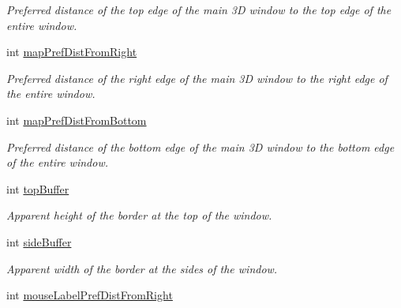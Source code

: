 \begin{DoxyCompactItemize}
\begin{DoxyCompactList}\small\item\em Preferred distance of the top edge of the main 3D window to the top edge of the entire window. \end{DoxyCompactList}\item 
\hypertarget{class_three_d_viewer_aa0bb32786f3a608cca7b11e56c18df91}{
int \hyperlink{class_three_d_viewer_aa0bb32786f3a608cca7b11e56c18df91}{mapPrefDistFromRight}}
\label{class_three_d_viewer_aa0bb32786f3a608cca7b11e56c18df91}

\begin{DoxyCompactList}\small\item\em Preferred distance of the right edge of the main 3D window to the right edge of the entire window. \end{DoxyCompactList}\item 
\hypertarget{class_three_d_viewer_a47fd9ef4a19bc68502192b2423449684}{
int \hyperlink{class_three_d_viewer_a47fd9ef4a19bc68502192b2423449684}{mapPrefDistFromBottom}}
\label{class_three_d_viewer_a47fd9ef4a19bc68502192b2423449684}

\begin{DoxyCompactList}\small\item\em Preferred distance of the bottom edge of the main 3D window to the bottom edge of the entire window. \end{DoxyCompactList}\item 
\hypertarget{class_three_d_viewer_a718c6698151357508ca72bc9a432a3a0}{
int \hyperlink{class_three_d_viewer_a718c6698151357508ca72bc9a432a3a0}{topBuffer}}
\label{class_three_d_viewer_a718c6698151357508ca72bc9a432a3a0}

\begin{DoxyCompactList}\small\item\em Apparent height of the border at the top of the window. \end{DoxyCompactList}\item 
\hypertarget{class_three_d_viewer_a20bded39c1e8aa840228739d14b56f40}{
int \hyperlink{class_three_d_viewer_a20bded39c1e8aa840228739d14b56f40}{sideBuffer}}
\label{class_three_d_viewer_a20bded39c1e8aa840228739d14b56f40}

\begin{DoxyCompactList}\small\item\em Apparent width of the border at the sides of the window. \end{DoxyCompactList}\item 
\hypertarget{class_three_d_viewer_a8184520e3b28bb4f0f451e677ebe2db3}{
int \hyperlink{class_three_d_viewer_a8184520e3b28bb4f0f451e677ebe2db3}{mouseLabelPrefDistFromRight}}
\label{class_three_d_viewer_a8184520e3b28bb4f0f451e677ebe2db3}


\end{DoxyCompactItemize}
